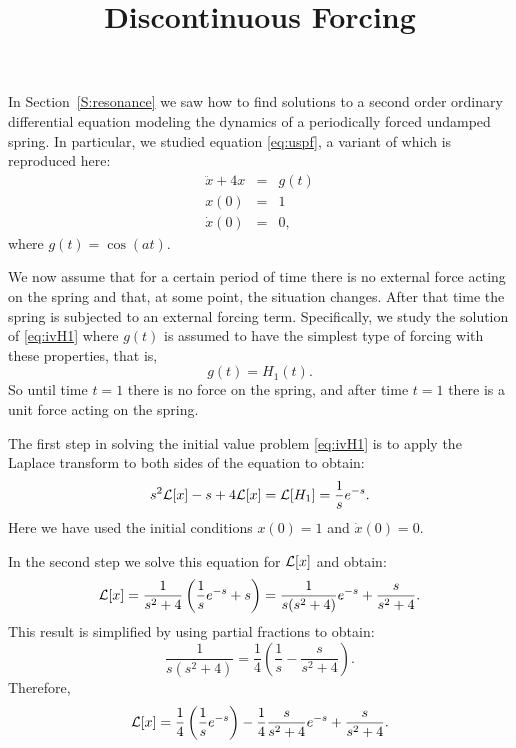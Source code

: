\documentclass{ximera}
\title{Discontinuous Forcing}
\begin{document}
\begin{abstract}
\end{abstract}
\maketitle

 \label{S:13.4}


In Section~\ref{S:resonance} we saw how to find solutions to a second 
order ordinary differential equation modeling the dynamics of a periodically
forced undamped spring.  
In particular, we studied equation \eqref{eq:uspf}, a variant of 
which is reproduced here:
\begin{equation}  \label{eq:ivH1}
\begin{array}{rcl}
   \ddot{x} + 4x & = & g(t) \\
    x(0) & = & 1 \\
    \dot{x}(0) & = & 0,
\end{array}
\end{equation}
where $g(t)=\cos(at)$.

We now assume that for a certain period of time there is no external 
force
acting on the spring and that, at some point, the situation changes. 
After that time the spring is subjected to an external forcing term.  
Specifically, we study the solution of \eqref{eq:ivH1} where $g(t)$ is 
assumed to have the simplest type of forcing with these properties, 
that is,  
\begin{equation}  \label{eq:Heavy1}
g(t) = H_1(t). 
\end{equation}
So until time $t=1$ there is no force on the spring, and after time $t=1$
there is a unit force acting on the spring.

The first step in solving the initial value problem \eqref{eq:ivH1} is to 
apply the Laplace transform to both sides of the equation to obtain:
\[
s^2{\cal L}[x]-s + 4{\cal L}[x] = {\cal L}[H_1] = \frac{1}{s}e^{-s}.
\]
Here we have used the initial conditions $x(0)=1$ and $\dot{x}(0)=0$.

In the second step we solve this equation for ${\cal L}[x]$ and obtain: 
\[
{\cal L}[x] = \frac{1}{s^2+4}\left( \frac{1}{s}e^{-s}+s\right)
=\frac{1}{s(s^2+4)}e^{-s}+\frac{s}{s^2+4}.
\]
This result is simplified by using partial fractions to obtain:
\[
\frac{1}{s(s^2+4)}=\frac{1}{4}\left(\frac{1}{s}-\frac{s}{s^2+4}\right).
\]
Therefore,
\[
{\cal L}[x] = \frac{1}{4}\left(\frac{1}{s}e^{-s}\right) -
\frac{1}{4}\frac{s}{s^2+4}e^{-s} + \frac{s}{s^2+4}.
\]
\end{document}
